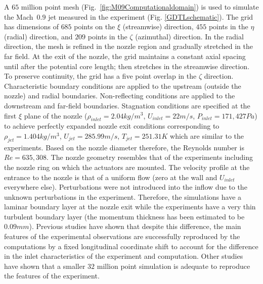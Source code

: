 \documentclass[english]{aiaa-tc}
\begin{document}
 A $65$ million point mesh (Fig.~\ref{fig:M09Computationaldomain}) is
 used to simulate the Mach~$0.9$ jet measured in the experiment (Fig.
 \ref{GDTLschematic}).  The grid has dimensions of $685$ points on the
 $\xi$ (streamwise) direction, $455$ points in the $\eta$ (radial)
 direction, and $209$ points in the $\zeta$ (azimuthal) direction. In
 the radial direction, the mesh is refined in the nozzle region and
 gradually stretched in the far field. At the exit of the nozzle, the
 grid maintains a constant axial spacing until after the potential
 core length; then stretches in the streamwise direction. To
 preserve continuity, the grid has a five point overlap in the $\zeta$
 direction. Characteristic boundary conditions\cite{bj2000-1} are
 applied to the upstream (outside the nozzle) and radial boundaries.
 Non-reflecting conditions are applied to the downstream and far-field
 boundaries. Stagnation conditions are specified at the first $\xi$
 plane of the nozzle ($\rho_{inlet}=2.04kg/m^{3}$, $U_{inlet}=22m/s$, $P_{inlet}=171,427Pa$) to
 achieve perfectly expanded nozzle exit conditions corresponding to
 $\rho_{jet}=1.404kg/m^{3}$, $U_{jet}=285.99m/s$, $T_{jet}=251.31K$ which are similar to the experiments.
 Based on the nozzle diameter therefore, the Reynolds number is
 $Re=635,308$. The nozzle geometry resembles that of the 
 experiments including the nozzle ring on which the actuators are
 mounted. 
 The velocity profile at the entrance to the nozzle is that
 of a uniform flow (zero at the wall and $U_{inlet}$ everywhere else).
 Perturbations were not introduced into the inflow due to the
 unknown perturbations in the experiment. Therefore, the simulations
 have a laminar boundary layer at the nozzle exit while the
 experiments have a very thin turbulent boundary layer (the momentum
 thickness has been estimated to be $0.09 mm$).  Previous studies have
 shown that despite this difference, the main features of the
 experimental observations are successfully reproduced by the
 computations by a fixed longitudinal coordinate shift to account
 for the difference in the inlet characteristics of the experiment and computation\cite{gdv2011-POF,SpethCF2013}.  Other studies have shown
 that a smaller $32$ million point simulation is adequate to reproduce
 the features of the experiment\cite{spethASME2013}.
\end{document}
